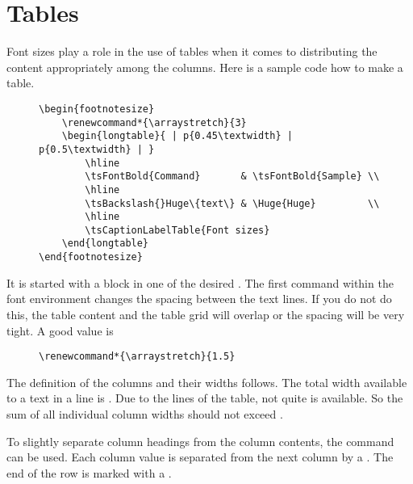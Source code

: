 \section{Tables}

Font sizes play a role in the use of tables when it comes to distributing
the content appropriately among the columns. Here is a sample code how to
make a table.

\begin{figure}[H]
    \footnotesize
    \centering
    \begin{BVerbatim}
\begin{footnotesize}
    \renewcommand*{\arraystretch}{3}
    \begin{longtable}{ | p{0.45\textwidth} | p{0.5\textwidth} | }
        \hline
        \tsFontBold{Command}       & \tsFontBold{Sample} \\
        \hline
        \tsBackslash{}Huge\{text\} & \Huge{Huge}         \\
        \hline
        \tsCaptionLabelTable{Font sizes}
    \end{longtable}
\end{footnotesize}
    \end{BVerbatim}
\end{figure}

It is started with a block in one of the desired .
The first command within the font environment changes the spacing between the
text lines. If you do not do this, the table content and the table grid will
overlap or the spacing will be very tight. A good value is

\begin{figure}[H]
    \small
    \centering
    \begin{BVerbatim}
\renewcommand*{\arraystretch}{1.5}
    \end{BVerbatim}
\end{figure}

The definition of the columns and their widths follows. The total width
available to a text in a line is . Due
to the lines of the table, not quite 
is available. So the sum of all individual column widths should not exceed
.
\bigbreak

To slightly separate column headings from the column contents, the\linebreak
{} command can be used. Each
column value is separated from the next column by a \tsFontCode{\&}. The end
of the row is marked with a \tsFontCode{\tsBackslash{}\tsBackslash{}}.
\bigbreak

